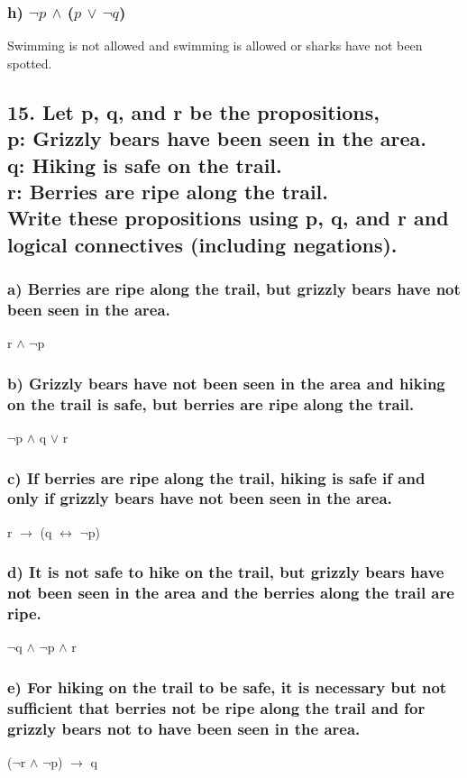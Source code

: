 \documentclass[11pt, oneside]{article} %
\numberwithin{equation}{section} %
\numberwithin{figure}{section} %
\numberwithin{table}{section} %
\begin{document}
\subsubsection{h) $\neg$$p$ $\wedge$ ($p$ $\vee$ $\neg$$q$)}
Swimming is not allowed and swimming is allowed or sharks have not been spotted.

\subsection{15. Let p, q, and r be the propositions,\\
p: Grizzly bears have been seen in the area.\\
q: Hiking is safe on the trail.\\
r: Berries are ripe along the trail.\\
Write these propositions using p, q, and r and logical connectives (including negations).}
\subsubsection{a) Berries are ripe along the trail, but grizzly bears have not been seen in the area.}
r $\wedge$ $\neg$p
\subsubsection{b) Grizzly bears have not been seen in the area and hiking on the trail is safe, but berries are ripe along the trail.}
$\neg$p $\wedge$ q $\vee$ r
\subsubsection{c) If berries are ripe along the trail, hiking is safe if and
only if grizzly bears have not been seen in the area.}
r $\rightarrow$ (q $\leftrightarrow$ $\neg$p)
\subsubsection{d) It is not safe to hike on the trail, but grizzly bears have not been seen in the area and the berries along the trail
are ripe.}
$\neg$q $\wedge$ $\neg$p $\wedge$ r
\subsubsection{e) For hiking on the trail to be safe, it is necessary but not
sufficient that berries not be ripe along the trail and
for grizzly bears not to have been seen in the area.}
($\neg$r $\wedge$ $\neg$p) $\rightarrow$ q
\end{document}
